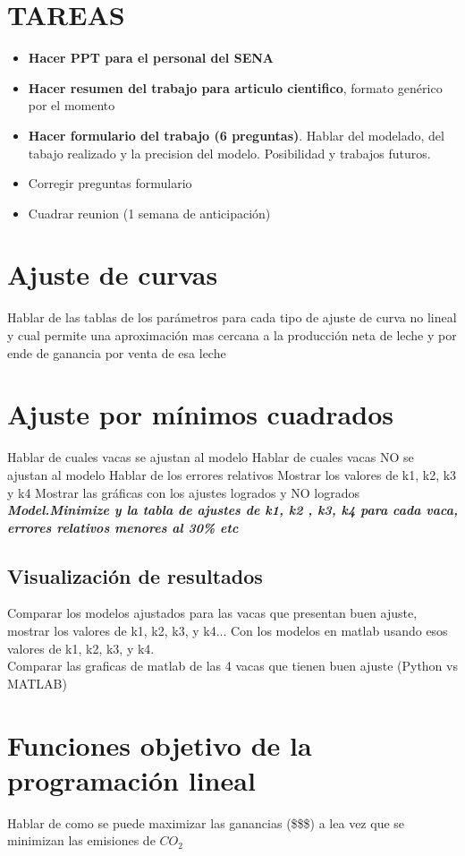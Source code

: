 \section{TAREAS}
\begin{itemize}
    \item  \textbf{Hacer PPT para el personal del SENA}
    \item  \textbf{Hacer resumen del trabajo para articulo cientifico}, formato genérico por el momento
    \item  \textbf{Hacer 
    formulario del trabajo (6 preguntas)}. Hablar  del modelado, del tabajo realizado y la precision del modelo. Posibilidad y trabajos futuros.
    \item Corregir preguntas formulario
    \item Cuadrar reunion (1 semana de anticipación)

\end{itemize}


\section{Ajuste de curvas}

Hablar de las tablas de los parámetros para cada tipo de ajuste de curva no lineal y cual permite una aproximación mas cercana a la producción neta de leche y por ende de ganancia por venta de esa leche


\section{Ajuste por mínimos cuadrados}
Hablar de cuales vacas se ajustan al modelo
Hablar de cuales vacas NO se ajustan al modelo
Hablar de los errores relativos
Mostrar los valores de k1, k2, k3 y k4
Mostrar las gráficas con los ajustes logrados y NO logrados\\

\textit{\textbf{Model.Minimize y la tabla de ajustes de k1, k2 , k3, k4 para cada vaca, errores relativos menores al 30\% etc}}

\subsection{Visualización de resultados}
Comparar los modelos ajustados para las vacas que presentan buen ajuste, mostrar los valores de k1, k2, k3, y k4... Con los modelos en matlab usando esos valores de k1, k2, k3, y k4.\\

Comparar las graficas de matlab de las 4 vacas que tienen buen ajuste (Python vs MATLAB)

\section{Funciones objetivo de la programación lineal}

Hablar de como se puede maximizar las ganancias (\$\$\$) a lea vez que se minimizan las emisiones de $CO_{2}$


